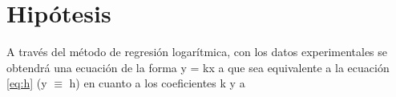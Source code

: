 \section{Hipótesis}
A través del método de regresión logarítmica, con los datos experimentales se obtendrá una ecuación de
la forma y = kx a que sea equivalente a la ecuación \ref{eq:h} (y $\equiv$ h) en cuanto a los coeficientes k y a
